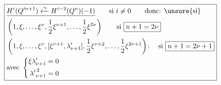 {\small
\[
\boxed{\begin{aligned}
&\underline{H^i(Q^{\prime n+1})\xleftarrow{\sim}H^{i-2}(Q^n)(-1)}\qquad \text{si }i\ne0\qquad\text{donc: \unsure{si}}\\
&\left(1,\xi,\ldots,\xi^\nu,\frac12\xi^{\nu+1},\ldots,\frac12\xi^{2\nu}\right)\qquad\text{si }\boxed{n+1=2\nu}\\
&\left(1,\xi,\ldots,\xi^\nu,[\xi^{\nu+1},\lambda'_{\nu+1}],\frac12\xi^{\nu+2},\ldots,\frac12\xi^{2\nu+1}\right)\!:\quad\text{si }\boxed{n+1=2\nu+1}\\
&\hfill\text{avec }\left\{\begin{aligned}\xi\lambda'_{\nu+1}&=0\\{\lambda'}_{\nu+1}^{\,2}&=0\end{aligned}\right.
\end{aligned}}
\]
}

